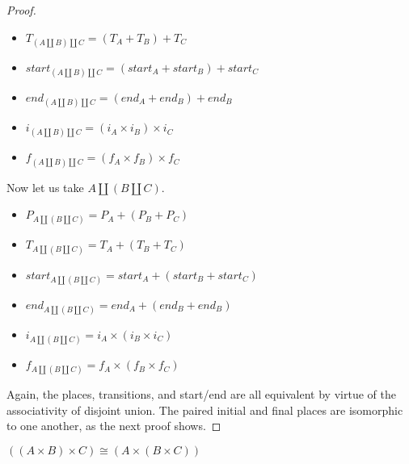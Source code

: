 \begin{proof}
\begin{itemize}
\item $T_{(A \amalg B)\amalg C} = (T_A + T_B)+ T_C$
\item $start_{(A \amalg B)\amalg C} = (start_A + start_B) + start_C$
\item $end_{(A \amalg B)\amalg C} = (end_A + end_B) + end_B$
\item $i_{(A \amalg B)\amalg C} = (i_A \times i_B)\times i_C$
\item$f_{(A \amalg B)\amalg C} = (f_A \times f_B)\times f_C$
\end{itemize}
Now let us take $A \amalg (B\amalg C)$.
\begin{itemize}
\item $P_{A \amalg (B\amalg C)}= P_A + (P_B + P_C)$
\item $T_{A \amalg (B\amalg C)} = T_A + (T_B+ T_C)$
\item $start_{A \amalg (B\amalg C)} = start_A + (start_B + start_C)$
\item $end_{A \amalg (B\amalg C)} = end_A + (end_B + end_B)$
\item $i_{A \amalg (B\amalg C)} = i_A \times (i_B\times i_C)$
\item$f_{A \amalg (B\amalg C)} = f_A \times (f_B\times f_C)$
\end{itemize}
Again, the places, transitions, and start/end are all equivalent by virtue of the associativity of disjoint union. The paired initial and final places are isomorphic to one another, as the next proof shows.
\end{proof}
\begin{lemma}
\label{PRODUCT-IS-ASSOCIATIVE}
 $((A \times B)\times C) \cong (A \times (B\times C))$
\end{lemma}
